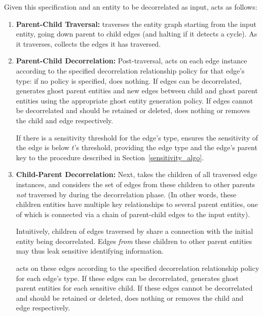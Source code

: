 Given this specification and an entity to be decorrelated as input, \sys acts as follows:
\begin{enumerate}
    \item \textbf{Parent-Child Traversal:} \sys traverses the entity graph starting from the input entity,
        going down parent to child edges (and halting if it detects a cycle).  As it traverses,
        \sys collects the edges it has traversed. 
    
    \item \textbf{Parent-Child Decorrelation:} Post-traversal, \sys acts on each edge instance
        according to the specified decorrelation relationship policy for that edge's type: if no
        policy is specified, \sys does nothing. If edges can be decorrelated, \sys generates
        ghost parent entities and new edges between child and ghost parent entities using the
        appropriate ghost entity generation policy. If edges cannot be decorrelated and should be
        retained or deleted, \sys does nothing or removes the child and edge respectively. 
    
        If there is a sensitivity threshold for the edge's type, \sys ensures the
        sensitivity of the edge is below $t$'s threshold, providing the edge type and the edge's
        parent key to the procedure described in Section~\ref{sensitivity_algo}. 

    \item \textbf{Child-Parent Decorrelation:} Next, \sys takes the children of all traversed edge
        instances, and considers the set of edges from these children to other parents
        \emph{not} traversed by \sys during the decorrelation phase. (In other words, these
        children entities have multiple key relationships to several parent entities, one of
        which is connected via a chain of parent-child edges to the input entity).

        Intuitively, children of edges traversed by \sys share a connection with the initial
        entity being decorrelated. Edges \emph{from} these children to other parent entities may
        thus leak sensitive identifying information. 

        \sys acts on these edges according to the specified decorrelation relationship policy for
        each edge's type. If these edges can be decorrelated, \sys generates ghost parent entities
        for each sensitive child.  If these edges cannot be decorrelated and should be retained or
        deleted, \sys does nothing or removes the child and edge respectively. 
        

\end{enumerate}

